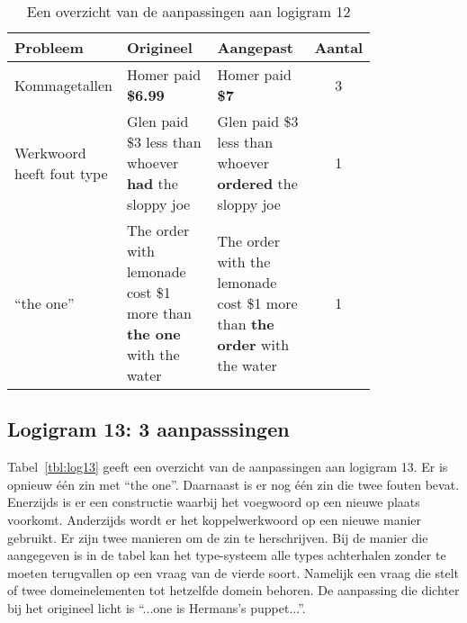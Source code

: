 \begin{table}[h]
  \centering
  \begin{tabular}{p{0.2\linewidth}p{0.3\linewidth}p{0.3\linewidth}c}
    \toprule
    \textbf{Probleem} & \textbf{Origineel} & \textbf{Aangepast} & \textbf{Aantal} \\ 
    \hline
    Kommagetallen & Homer paid \textbf{\$6.99} & Homer paid \textbf{\$7} & 3 \\
    \hline
    Werkwoord heeft fout type & Glen paid \$3 less than whoever \textbf{had} the sloppy joe & Glen paid \$3 less than whoever \textbf{ordered} the sloppy joe & 1 \\
    \hline
    ``the one'' & The order with lemonade cost \$1 more than \textbf{the one} with the water & The order with the lemonade cost \$1 more than \textbf{the order} with the water & 1 \\
    \bottomrule
  \end{tabular}
  \caption{Een overzicht van de aanpassingen aan logigram 12}
  \label{tbl:log12}
\end{table}

\subsection{Logigram 13: 3 aanpasssingen}
Tabel~\ref{tbl:log13} geeft een overzicht van de aanpassingen aan logigram 13. Er is opnieuw één zin met ``the one''. Daarnaast is er nog één zin die twee fouten bevat. Enerzijds is er een constructie waarbij het voegwoord op een nieuwe plaats voorkomt. Anderzijds wordt er het koppelwerkwoord op een nieuwe manier gebruikt. Er zijn twee manieren om de zin te herschrijven. Bij de manier die aangegeven is in de tabel kan het type-systeem alle types achterhalen zonder te moeten terugvallen op een vraag van de vierde soort. Namelijk een vraag die stelt of twee domeinelementen tot hetzelfde domein behoren. De aanpassing die dichter bij het origineel licht is ``...one is Hermans's puppet...''.

